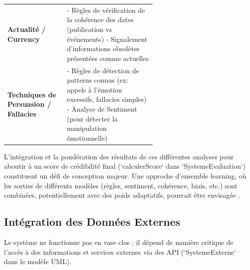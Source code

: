 \documentclass[9pt,twocolumn,french]{article}
\begin{document}
\begin{table}[htbp]
\begin{tabular}{@{}lp{0.6\linewidth}@{}}
    \addlinespace
    \textbf{Actualité / Currency} \citep{Rieh2014Credibility} & - Règles de vérification de la cohérence des dates (publication vs événements) \newline - Signalement d'informations obsolètes présentées comme actuelles \\
    \addlinespace
    \textbf{Techniques de Persuasion / Fallacies} \citep{Pescuma2025, Oshikawa2019A} & - Règles de détection de patterns connus (ex: appels à l'émotion excessifs, fallacies simples) \citep{Metzger2010, Oshikawa2019A} \newline - Analyse de Sentiment (pour détecter la manipulation émotionnelle) \citep{Ahmed2025Aidriven} \\
    \bottomrule
  \end{tabular}
\end{table}

L'intégration et la pondération des résultats de ces différentes analyses pour aboutir à un score de crédibilité final (`calculerScore` dans `SystemeEvaluation`) constituent un défi de conception majeur. Une approche d'ensemble learning, où les sorties de différents modèles (règles, sentiment, cohérence, biais, etc.) sont combinées, potentiellement avec des poids adaptatifs, pourrait être envisagée \citep{Ahmed2025Aidriven}.

\subsection{Intégration des Données Externes}

Le système ne fonctionne pas en vase clos ; il dépend de manière critique de l'accès à des informations et services externes via des API (`SystemeExterne` dans le modèle UML).
\end{document}
